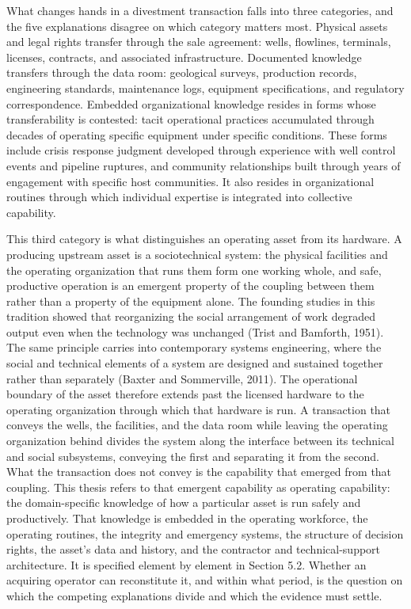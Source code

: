 \documentclass[twoside,fontset=lmodern]{mitthesis}
\begin{document}
What changes hands in a divestment transaction falls into three
categories, and the five explanations disagree on which category matters
most. Physical assets and legal rights transfer through the sale
agreement: wells, flowlines, terminals, licenses, contracts, and
associated infrastructure. Documented knowledge transfers through the
data room: geological surveys, production records, engineering
standards, maintenance logs, equipment specifications, and regulatory
correspondence. Embedded organizational knowledge resides in forms whose
transferability is contested: tacit operational practices accumulated
through decades of operating specific equipment under specific
conditions. These forms include crisis response judgment developed
through experience with well control events and pipeline ruptures, and
community relationships built through years of engagement with specific
host communities. It also resides in organizational routines through
which individual expertise is integrated into collective capability.

This third category is what distinguishes an operating asset from its
hardware. A producing upstream asset is a sociotechnical system: the
physical facilities and the operating organization that runs them form
one working whole, and safe, productive operation is an emergent
property of the coupling between them rather than a property of the
equipment alone. The founding studies in this tradition showed that
reorganizing the social arrangement of work degraded output even when
the technology was unchanged (Trist and Bamforth, 1951). The same
principle carries into contemporary systems engineering, where the
social and technical elements of a system are designed and sustained
together rather than separately (Baxter and Sommerville, 2011). The
operational boundary of the asset therefore extends past the licensed
hardware to the operating organization through which that hardware is
run. A transaction that conveys the wells, the facilities, and the data
room while leaving the operating organization behind divides the system
along the interface between its technical and social subsystems,
conveying the first and separating it from the second. What the
transaction does not convey is the capability that emerged from that
coupling. This thesis refers to that emergent capability as operating
capability: the domain-specific knowledge of how a particular asset is
run safely and productively. That knowledge is embedded in the operating
workforce, the operating routines, the integrity and emergency systems,
the structure of decision rights, the asset's data and history, and the
contractor and technical-support architecture. It is specified element
by element in Section 5.2. Whether an acquiring operator can
reconstitute it, and within what period, is the question on which the
competing explanations divide and which the evidence must settle.
\end{document}
